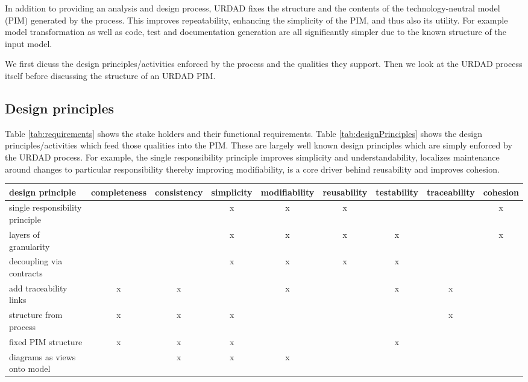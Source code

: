 In addition to providing an analysis and design process, URDAD fixes the structure and the contents of the technology-neutral model (PIM) generated by the process. This improves repeatability, enhancing the simplicity of the PIM, and thus also its utility. For example model transformation as well as code, test and documentation generation are all significantly simpler due to the known structure of the input model.

We first dicuss the design principles/activities enforced by the process and the qualities they support. Then we look at the URDAD process itself before discussing the structure of an URDAD PIM.


\subsection{Design principles}

Table \ref{tab:requirements} shows the stake holders and their functional requirements. Table \ref{tab:designPrinciples} shows the design principles/activities which feed those qualities into the PIM. These are largely well known design principles which are simply enforced by the URDAD process.
For example, the single responsibility principle improves simplicity and understandability, localizes maintenance around changes to particular responsibility thereby improving modifiability, is a core driver behind reusability and improves cohesion.

\begin{table*}[htb]
  \caption{Quality requirements and design principles through which they are realized. \label{tab:designPrinciples}}
	{\small
  \begin{tabular}{|l||c|c|c|c|c|c|c|c|}
    \hline
	{\bf design principle} & completeness & consistency & simplicity & modifiability & reusability & testability & traceability & cohesion \\ \hline
	single responsibility principle  &   &   & x & x & x &   &   & x \\ \hline
	layers of granularity            &   &   & x & x & x & x &   & x \\ \hline
	decoupling via contracts         &   &   & x & x & x & x &   &   \\ \hline
	add traceability links           & x & x &   & x &   & x & x &   \\ \hline
	structure from process           & x & x & x &   &   &   & x &   \\ \hline
	fixed PIM structure              & x & x & x &   &   & x &   &   \\ \hline
	diagrams as views onto model     &   & x & x & x &   &   &   &   \\ \hline
  \end{tabular}}
\end{table*}


